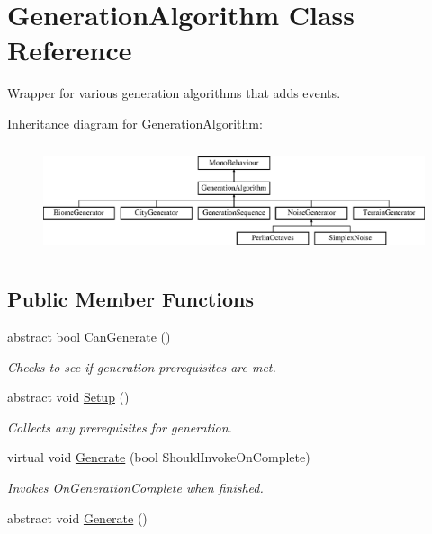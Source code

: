 \hypertarget{class_generation_algorithm}{}\section{Generation\+Algorithm Class Reference}
\label{class_generation_algorithm}


Wrapper for various generation algorithms that adds events.  


Inheritance diagram for Generation\+Algorithm\+:\begin{figure}[H]
\begin{center}
\leavevmode
\includegraphics[height=3.246377cm]{class_generation_algorithm}
\end{center}
\end{figure}
\subsection*{Public Member Functions}
\begin{DoxyCompactItemize}
\item 
abstract bool \mbox{\hyperlink{class_generation_algorithm_af7d03e24e3b7fecfe2ae43f06915986d}{Can\+Generate}} ()
\begin{DoxyCompactList}\small\item\em Checks to see if generation prerequisites are met. \end{DoxyCompactList}\item 
abstract void \mbox{\hyperlink{class_generation_algorithm_a5e891b08f0c1d8f4ccc9ad06667691ec}{Setup}} ()
\begin{DoxyCompactList}\small\item\em Collects any prerequisites for generation. \end{DoxyCompactList}\item 
virtual void \mbox{\hyperlink{class_generation_algorithm_a9c0cc2cf748d7320651aa8d48d81c407}{Generate}} (bool Should\+Invoke\+On\+Complete)
\begin{DoxyCompactList}\small\item\em Invokes On\+Generation\+Complete when finished. \end{DoxyCompactList}\item 
abstract void \mbox{\hyperlink{class_generation_algorithm_ac2df20f7751c1b480ab958791d5c7d41}{Generate}} ()
\end{DoxyCompactItemize}
